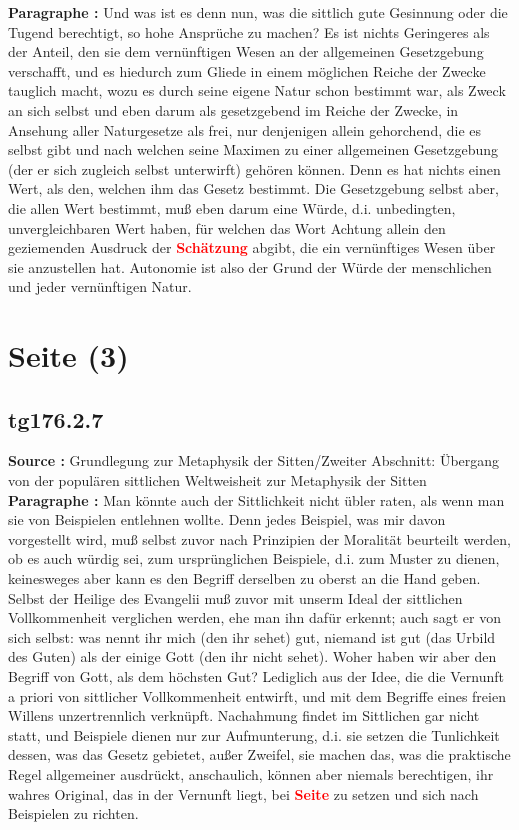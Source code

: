 \documentclass[a4paper,12pt,twoside]{book}
\newcommand{\match}[1]{\textcolor{red}{\textbf{#1}}}
\newcommand{\unnumberedsection}[1]{
	\section*{#1}
	\addcontentsline{toc}{section}{#1}
	\markright{#1}
}
\begin{document}
	\noindent\textbf{Paragraphe : }Und was ist es denn nun, was die sittlich gute Gesinnung oder die Tugend berechtigt, so hohe Ansprüche zu machen? Es ist nichts Geringeres als der Anteil, den sie dem vernünftigen Wesen an der allgemeinen Gesetzgebung verschafft, und es hiedurch zum Gliede in einem möglichen Reiche der Zwecke tauglich macht, wozu es durch seine eigene Natur schon bestimmt war, als Zweck an sich selbst und eben darum als gesetzgebend im Reiche der Zwecke, in Ansehung aller Naturgesetze als frei, nur denjenigen allein gehorchend, die es selbst gibt und nach welchen seine Maximen zu einer allgemeinen Gesetzgebung (der er sich zugleich selbst unterwirft) gehören können. Denn es hat nichts einen Wert, als den, welchen ihm das Gesetz bestimmt. Die Gesetzgebung selbst aber, die allen Wert bestimmt, muß eben darum eine Würde, d.i. unbedingten, unvergleichbaren Wert haben, für welchen das Wort Achtung allein den geziemenden Ausdruck der \match{Schätzung} abgibt, die ein vernünftiges Wesen über sie anzustellen hat. Autonomie ist also der Grund der Würde der menschlichen und jeder vernünftigen Natur. 
	
	\unnumberedsection{Seite (3)} 
	\subsection*{tg176.2.7} 
	\textbf{Source : }Grundlegung zur Metaphysik der Sitten/Zweiter Abschnitt: Übergang von der populären sittlichen Weltweisheit zur Metaphysik der Sitten\\  
	
	\noindent\textbf{Paragraphe : }Man könnte auch der Sittlichkeit nicht übler raten, als wenn man sie von Beispielen entlehnen wollte. Denn jedes Beispiel, was mir davon vorgestellt wird, muß selbst zuvor nach Prinzipien der Moralität beurteilt werden, ob es auch würdig sei, zum ursprünglichen Beispiele, d.i. zum Muster zu dienen, keinesweges aber kann es den Begriff derselben zu oberst an die Hand geben. Selbst der Heilige des Evangelii muß zuvor mit unserm Ideal der sittlichen Vollkommenheit verglichen werden, ehe man ihn dafür erkennt; auch sagt er von sich selbst: was nennt ihr mich (den ihr sehet) gut, niemand ist gut (das Urbild des Guten) als der einige Gott (den ihr nicht sehet). Woher haben wir aber den Begriff von Gott, als dem höchsten Gut? Lediglich aus der Idee, die die Vernunft a priori von sittlicher Vollkommenheit entwirft, und mit dem Begriffe eines freien Willens unzertrennlich verknüpft. Nachahmung findet im Sittlichen gar nicht statt, und Beispiele dienen nur zur Aufmunterung, d.i. sie setzen die Tunlichkeit dessen, was das Gesetz gebietet, außer Zweifel, sie machen das, was die praktische Regel allgemeiner ausdrückt, anschaulich, können aber niemals  berechtigen, ihr wahres Original, das in der Vernunft liegt, bei \match{Seite} zu setzen und sich nach Beispielen zu richten. 
	
\end{document}
